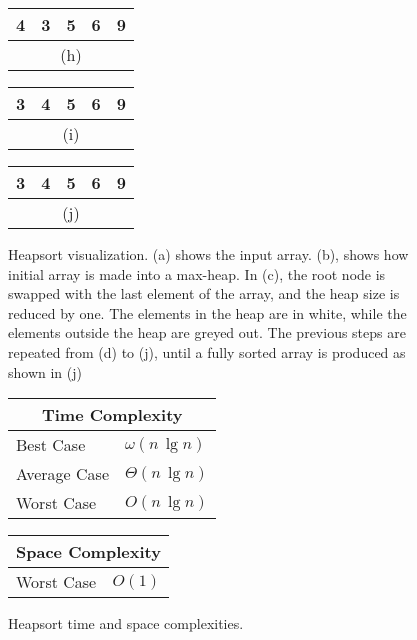 \begin{figure}[!ht]
\begin{tabular}{|c|c|c|c|c|}
    \hline
    4 & 3 & \cellcolor{lightgray}5 & \cellcolor{lightgray}6 & \cellcolor{lightgray}9 \\
    \hline
    \multicolumn{5}{c}{(h)} \\
    \end{tabular}
    \break
    \begin{tabular}{|c|c|c|c|c|}
    \hline
    3 & \cellcolor{lightgray}4 & \cellcolor{lightgray}5 & \cellcolor{lightgray}6 & \cellcolor{lightgray}9 \\
    \hline
    \multicolumn{5}{c}{(i)} \\
    \end{tabular}
    \quad\quad\quad
    \begin{tabular}{|c|c|c|c|c|}
    \hline
    \cellcolor{lightgray}3 & \cellcolor{lightgray}4 & \cellcolor{lightgray}5 & \cellcolor{lightgray}6 & \cellcolor{lightgray}9 \\
    \hline
    \multicolumn{5}{c}{(j)} \\
    \end{tabular}
    
    \caption{Heapsort visualization. (a) shows the input array. (b),  shows how initial array is made into a max-heap. In (c), the root node is swapped with the last element of the array, and the heap size is reduced by one. The elements in the heap are in white, while the elements outside the heap are greyed out. The previous steps are repeated from (d) to (j), until a fully sorted array is produced as shown in (j)}
    \label{fig:heapsort_ex}
\end{figure}

\begin{figure}[!ht]
    \centering
    \begin{tabular}{l|l}
    \multicolumn{2}{c}{\textbf{Time Complexity}} \\
    \hline
    Best Case    & $\omega(n \, \lg n)$ \\
    Average Case & $\Theta(n \, \lg n)$ \\
    Worst Case   & $O(n \, \lg n)$ \\
    \end{tabular}
    \quad\quad
    \begin{tabular}{l|l}
    \multicolumn{2}{c}{\textbf{Space Complexity}} \\
    \hline
    Worst Case   & $O(1)$
    \end{tabular}
    
    \caption{Heapsort time\cite{clrs2009} and space complexities\cite{big-o}.}
    \label{fig:heapsort}
\end{figure}

